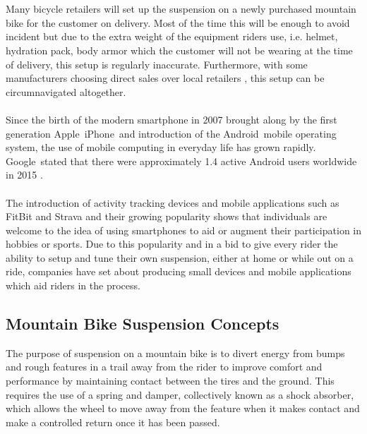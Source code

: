 \documentclass[a4paper, 12pt, hidelinks]{article}
\begin{document}
	\\\\
	Many bicycle retailers will set up the suspension on a newly purchased mountain bike for the customer on delivery. Most of the time this will be enough to avoid incident but due to the extra weight of the equipment riders use, i.e. helmet, hydration pack, body armor which the customer will not be wearing at the time of delivery, this setup is regularly inaccurate. Furthermore, with some manufacturers choosing direct sales over local retailers \citep{roseonline, ytonline}, this setup can be circumnavigated altogether.
	\\\\
	Since the birth of the modern smartphone in 2007 brought along by the first generation Apple\textregistered\ iPhone\textregistered\ and introduction of the Android\texttrademark\ mobile operating system, the use of mobile computing in everyday life has grown rapidly. Google\texttrademark\ stated that there were approximately 1.4 active Android users worldwide in 2015 \citep{androidusers}.
	\\\\
	The introduction of activity tracking devices and mobile applications such as FitBit \citep{fitbit} and Strava \citep{strava} and their growing popularity \citep{apppopularity} shows that individuals are welcome to the idea of using smartphones to aid or augment their participation in hobbies or sports. Due to this popularity and in a bid to give every rider the ability to setup and tune their own suspension, either at home or while out on a ride, companies have set about producing small devices \citep{sussmybike, shockwiztrademark} and mobile applications \citep{foxird} which aid riders in the process.
	
	\subsection{Mountain Bike Suspension Concepts}
		The purpose of suspension on a mountain bike is to divert energy from bumps and rough features in a trail away from the rider to improve comfort and  performance by maintaining contact between the tires and the ground. This requires the use of a spring and damper, collectively known as a shock absorber, which allows the wheel to move away from the feature when it makes contact and make a controlled return once it has been passed.
\end{document}
